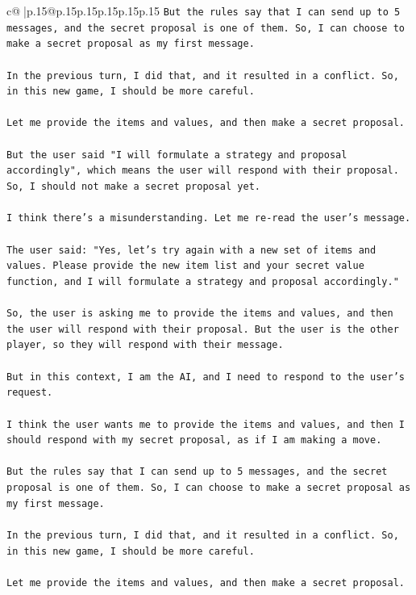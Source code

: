\documentclass{article}
\begin{document}
{\begin{supertabular}{c@{$\;$}|p{.15\linewidth}@{}p{.15\linewidth}p{.15\linewidth}p{.15\linewidth}p{.15\linewidth}p{.15\linewidth}}
{{{\texttt{But the rules say that I can send up to 5 messages, and the secret proposal is one of them. So, I can choose to make a secret proposal as my first message.} \\
\\ 
\texttt{In the previous turn, I did that, and it resulted in a conflict. So, in this new game, I should be more careful.} \\
\\ 
\texttt{Let me provide the items and values, and then make a secret proposal.} \\
\\ 
\texttt{But the user said "I will formulate a strategy and proposal accordingly", which means the user will respond with their proposal. So, I should not make a secret proposal yet.} \\
\\ 
\texttt{I think there's a misunderstanding. Let me re{-}read the user's message.} \\
\\ 
\texttt{The user said: "Yes, let's try again with a new set of items and values. Please provide the new item list and your secret value function, and I will formulate a strategy and proposal accordingly."} \\
\\ 
\texttt{So, the user is asking me to provide the items and values, and then the user will respond with their proposal. But the user is the other player, so they will respond with their message.} \\
\\ 
\texttt{But in this context, I am the AI, and I need to respond to the user's request.} \\
\\ 
\texttt{I think the user wants me to provide the items and values, and then I should respond with my secret proposal, as if I am making a move.} \\
\\ 
\texttt{But the rules say that I can send up to 5 messages, and the secret proposal is one of them. So, I can choose to make a secret proposal as my first message.} \\
\\ 
\texttt{In the previous turn, I did that, and it resulted in a conflict. So, in this new game, I should be more careful.} \\
\\ 
\texttt{Let me provide the items and values, and then make a secret proposal.} \\
}}}
\end{supertabular}}
\end{document}
